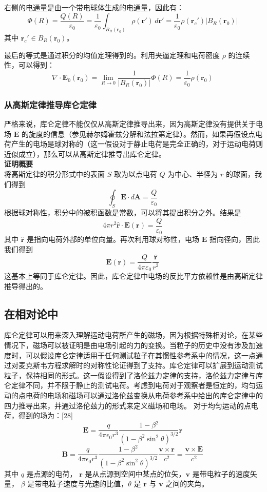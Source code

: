 右侧的电通量是由一个带电球体生成的电通量，因此有：
\[
\Phi(R) = \frac{Q(R)}{\varepsilon_0} = \frac{1}{\varepsilon_0} \int_{B_R(\mathbf{r}_0)} \rho(\mathbf{r'}) \, d\mathbf{r'} = \frac{1}{\varepsilon_0} \rho(\mathbf{r}_c') |B_R(\mathbf{r}_0)|~
\]
其中 \(\mathbf{r}_c' \in B_R(\mathbf{r}_0)\)。

最后的等式是通过积分的均值定理得到的。利用夹逼定理和电荷密度 \(\rho\) 的连续性，可以得到：
\[
\nabla \cdot \mathbf{E}_0(\mathbf{r}_0) = \lim_{R \to 0} \frac{1}{|B_R(\mathbf{r}_0)|} \Phi(R) = \frac{1}{\varepsilon_0} \rho(\mathbf{r}_0)~
\]
\subsubsection{从高斯定律推导库仑定律}

严格来说，库仑定律不能仅仅从高斯定律推导出来，因为高斯定律没有提供关于电场 \(\mathbf{E}\) 的旋度的信息（参见赫尔姆霍兹分解和法拉第定律）。然而，如果再假设点电荷产生的电场是球对称的（这一假设对于静止电荷是完全正确的，对于运动电荷则近似成立），那么可以从高斯定律推导出库仑定律。\\
\textbf{证明概要}\\
将高斯定律的积分形式中的表面 \( S \) 取为以点电荷 \( Q \) 为中心、半径为 \( r \) 的球面，我们得到
\[
\oint_S \mathbf{E} \cdot d\mathbf{A} = \frac{Q}{\varepsilon_0}~
\]
根据球对称性，积分中的被积函数是常数，可以将其提出积分之外。结果是
\[
4\pi r^2 \hat{\mathbf{r}} \cdot \mathbf{E} (\mathbf{r}) = \frac{Q}{\varepsilon_0}~
\]
其中 \( \hat{\mathbf{r}} \) 是指向电荷外部的单位向量。再次利用球对称性，电场 \( \mathbf{E} \) 指向径向，因此我们得到
\[
\mathbf{E} (\mathbf{r}) = \frac{Q}{4\pi \varepsilon_0} \frac{\hat{\mathbf{r}}}{r^2}~
\]
这基本上等同于库仑定律。因此，库仑定律中电场的反比平方依赖性是由高斯定律推导得出的。
\subsection{在相对论中}  
库仑定律可以用来深入理解运动电荷所产生的磁场，因为根据特殊相对论，在某些情况下，磁场可以被证明是由电场引起的力的变换。当粒子的历史中没有涉及加速度时，可以假设库仑定律适用于任何测试粒子在其惯性参考系中的情况，这一点通过对麦克斯韦方程求解时的对称性论证得到了支持。库仑定律可以扩展到运动测试粒子，保持相同的形式。这一假设得到了洛伦兹力定律的支持，洛伦兹力定律与库仑定律不同，并不限于静止的测试电荷。考虑到电荷对于观察者是恒定的，均匀运动的点电荷的电场和磁场可以通过洛伦兹变换从电荷参考系中给出的库仑定律中的四力推导出来，并通过洛伦兹力的形式来定义磁场和电场。  
对于均匀运动的点电荷，得到的场为：[28]
\[
\mathbf{E} = \frac{q}{4 \pi \epsilon_0 r^3} \frac{1 - \beta^2}{(1 - \beta^2 \sin^2 \theta)^{3/2}} \mathbf{r}~
\]
\[
\mathbf{B} = \frac{q}{4 \pi \epsilon_0 r^3} \frac{1 - \beta^2}{(1 - \beta^2 \sin^2 \theta)^{3/2}} \frac{\mathbf{v} \times \mathbf{r}}{c^2} = \frac{\mathbf{v} \times \mathbf{E}}{c^2}~
\]
其中  \( q \) 是点源的电荷，  \( \mathbf{r} \) 是从点源到空间中某点的位矢，\( \mathbf{v} \) 是带电粒子的速度矢量，  \( \beta \) 是带电粒子速度与光速的比值，\( \theta \) 是 \( \mathbf{r} \) 与 \( \mathbf{v} \) 之间的夹角。  

